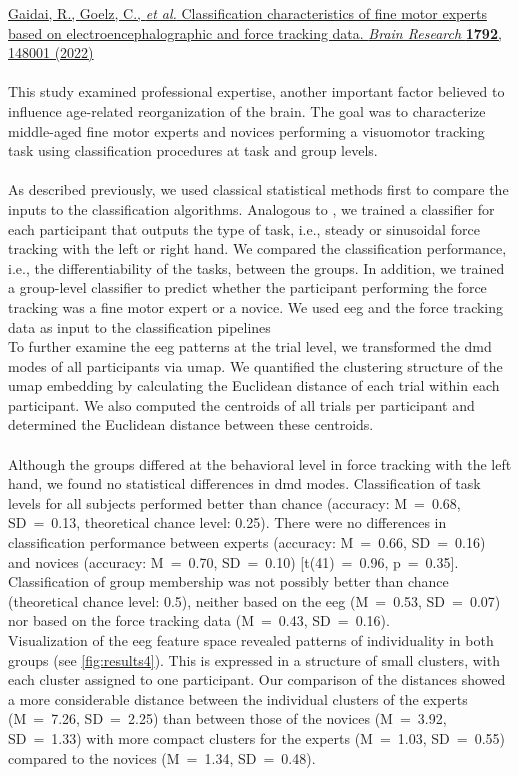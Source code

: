 \hyperref[pub:paperIV]{Gaidai, R., Goelz, C., \textit{et al.} Classification characteristics of fine motor experts based on electroencephalographic and force tracking data. \textit{Brain Research} \textbf{1792}, 148001 (2022)}\\
\\
This study examined professional expertise, another important factor believed to influence age-related reorganization of the brain. The goal was to characterize middle-aged fine motor experts and novices performing a visuomotor tracking task using classification procedures at task and group levels.\\
\\
As described previously, we used classical statistical methods first to compare the inputs to the classification algorithms. Analogous to , we trained a classifier for each participant that outputs the type of task, i.e., steady or sinusoidal force tracking with the left or right hand. We compared the classification performance, i.e., the differentiability of the tasks, between the groups. In addition, we trained a group-level classifier to predict whether the participant performing the force tracking was a fine motor expert or a novice. We used \gls{eeg} and the force tracking data as input to the classification pipelines\\
To further examine the \gls{eeg} patterns at the trial level, we transformed the \gls{dmd} modes of all participants via \gls{umap}. We quantified the clustering structure of the \gls{umap} embedding by calculating the Euclidean distance of each trial within each participant. We also computed the centroids of all trials per participant and determined the Euclidean distance between these centroids.\\
\\
Although the groups differed at the behavioral level in force tracking with the left hand, we found no statistical differences in \gls{dmd} modes. Classification of task levels for all subjects performed better than chance (accuracy: M~=~0.68, SD~=~0.13, theoretical chance level: 0.25). There were no differences in classification performance between experts (accuracy: M~=~0.66, SD~=~0.16) and novices (accuracy: M~=~0.70, SD~=~0.10) [t(41)~=~0.96, p~=~0.35].\\
Classification of group membership was not possibly better than chance (theoretical chance level: 0.5), neither based on the \gls{eeg} (M~=~0.53, SD~=~0.07) nor based on the force tracking data (M~=~0.43, SD~=~0.16).\\
Visualization of the \gls{eeg} feature space revealed patterns of individuality in both groups (see \autoref{fig:results4}). This is expressed in a structure of small clusters, with each cluster assigned to one participant. Our comparison of the distances showed a more considerable distance between the individual clusters of the experts (M~=~7.26, SD~=~2.25) than between those of the novices (M~=~3.92, SD~=~1.33) with more compact clusters for the experts (M~=~1.03, SD~=~0.55) compared to the novices (M~=~1.34, SD~=~0.48).

